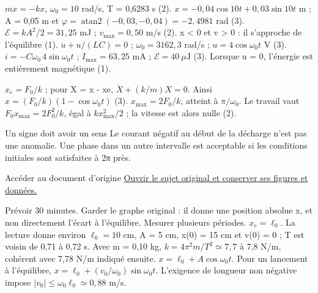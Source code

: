 $m\ddot x=-kx$, $\omega_0=10$ rad/s, T = 0,6283 s (2). $x=-0{,}04\cos10t+0{,}03\sin10t$ m ; A = 0,05 m et $\varphi=\operatorname{atan2}(-0{,}03,-0{,}04)=-2{,}4981$ rad (3). $\mathcal E=kA^2/2=31{,}25$ mJ ; $v_{\max}=0{,}50$ m/s (2). x < 0 et v > 0 : il s’approche de l’équilibre (1).
$\ddot u+u/(LC)=0$ ; $\omega_0=3162{,}3$ rad/s ; $u=4\cos\omega_0t$ V (3). $i=-C\omega_0\,4\sin\omega_0t$ ; $I_{\max}=63{,}25$ mA ; $\mathcal E=40\ \mu\mathrm{ J}$ (3). Lorsque u = 0, l’énergie est entièrement magnétique (1).


$x_e=F_0/k$ ; pour X = x - xe, $\ddot X+(k/m)X=0$. Ainsi $x=(F_0/k)(1-\cos\omega_0t)$ (3). $x_{\max}=2F_0/k$, atteint à $\pi/\omega_0$. Le travail vaut $F_0x_{\max}=2F_0^2/k$, égal à $kx_{\max}^2/2$ ; la vitesse est alors nulle (2).
\begin{methode}{Un signe doit avoir un sens}
Le courant négatif au début de la décharge n’est pas une anomalie. Une phase dans un autre intervalle est acceptable si les conditions initiales sont satisfaites à 2π près.
\end{methode}


\begin{loi}{Accéder au document d’origine}
\href{https://cahier-de-prepa.fr/mp*-condorcet/download?id=98&v=66f32}{Ouvrir le sujet original et conserver ses figures et données.}
\end{loi}
Prévoir 30 minutes. Garder le graphe original : il donne une position absolue x, et non directement l’écart à l’équilibre. Mesurer plusieurs périodes.
$x_e=\ell_0$. La lecture donne environ $\ell_0=10$ cm, A = 5 cm, x(0) = 15 cm et v(0) = 0 ; T est voisin de 0,71 à 0,72 s. Avec m = 0,10 kg, $k=4\pi^2m/T^2\simeq7{,}7$ à 7,8 N/m, cohérent avec 7,78 N/m indiqué ensuite. $x=\ell_0+A\cos\omega_0t$. Pour un lancement à l’équilibre, $x=\ell_0+(v_0/\omega_0)\sin\omega_0t$. L’exigence de longueur non négative impose $|v_0|\leq\omega_0\ell_0\simeq0{,}88$ m/s.

